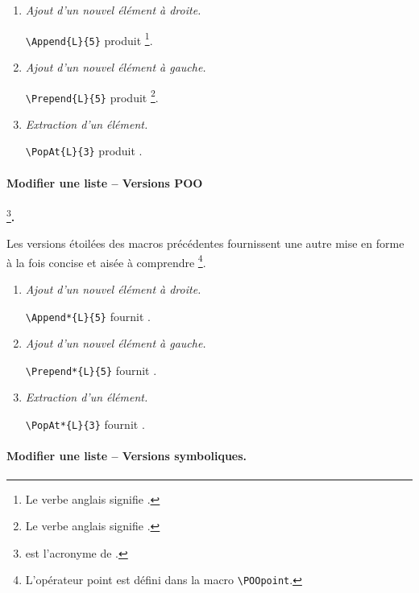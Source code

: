 \begin{enumerate}
	\item \textit{Ajout d'un nouvel élément à droite.}

	      \verb+\Append{L}{5}+ produit 
	      \footnote{
		       Le verbe anglais  signifie .
		  }.


	\item \textit{Ajout d'un nouvel élément à gauche.}

	      \verb+\Prepend{L}{5}+ produit 
	      \footnote{
		       Le verbe anglais  signifie .
		  }.


	\item \textit{Extraction d'un élément.}

	      \verb+\PopAt{L}{3}+ produit .
\end{enumerate}



\paragraph{Modifier une liste -- Versions POO}
\footnote{
	 est l'acronyme de .
}\textbf{.}\phantom{XX}\smallskip

Les versions étoilées des macros précédentes fournissent une autre mise en forme à la fois concise et aisée à comprendre
\footnote{
	L'opérateur point \POOpoint{} est défini dans la macro \texttt{\textbackslash{}POOpoint}.
}.

\begin{enumerate}
	\item \textit{Ajout d'un nouvel élément à droite.}

	      \verb++ fournit \Append*{L}{5}.


	\item \textit{Ajout d'un nouvel élément à gauche.}

	      \verb++ fournit \Prepend*{L}{5}.


	\item \textit{Extraction d'un élément.}

	      \verb++ fournit \PopAt*{L}{3}.
\end{enumerate}



\paragraph{Modifier une liste -- Versions symboliques.}\phantom{XX}\smallskip

